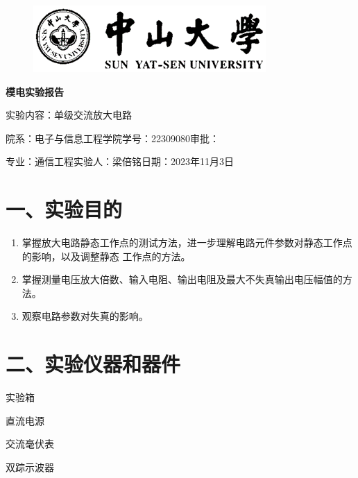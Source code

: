 \documentclass[a4paper,10pt,notitlepage]{article}
\begin{document}
		\large
		\onehalfspacing
		\begin{figure}[h]
			\raggedright
			\includegraphics{1-1.png}
		\end{figure}
		\centering
		{\Huge\textbf{模电实验报告}\par}
		\vspace{0.2cm}
		{\huge{实验内容：单级交流放大电路}\par}
		\raggedright
		\vspace{0.3cm}
		\begin{centering}
			{\large 院系：电子与信息工程学院\hfill 学号：22309080\hfill 审批：\hspace{2cm} \par
			专业：通信工程\hfill 实验人：梁倍铭\hfill 日期：2023年11月3日 \par}
		\end{centering}
		\vspace{0.3cm}
		\section*{一、实验目的}
			\begin{enumerate}
				\item 掌握放大电路静态工作点的测试方法，进一步理解电路元件参数对静态工作点的影响，以及调整静态  工作点的方法。
				\item 掌握测量电压放大倍数、输入电阻、输出电阻及最大不失真输出电压幅值的方法。
				\item 观察电路参数对失真的影响。
			\end{enumerate}
		\section*{二、实验仪器和器件}
			\begin{inparaenum}
				\item 实验箱
				\item 直流电源 
				\item 交流毫伏表
				\item 双踪示波器
			\end{inparaenum}
\end{document}
